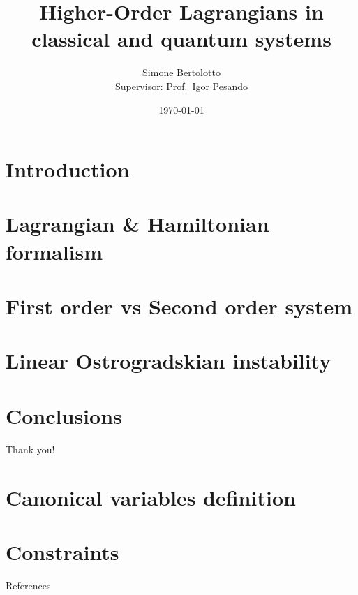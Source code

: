 \documentclass[10pt]{beamer}
\title{Higher-Order Lagrangians in classical and quantum systems}
\date{\today}
\author{Simone Bertolotto\\{\small Supervisor: Prof.\ Igor Pesando}}
\institute{Università degli studi di Torino --- Fisica}
\begin{document}
  \maketitle

  \section{Introduction}
  

  \section{Lagrangian \& Hamiltonian formalism}
  

  \section{First order vs Second order system}
  

  \section{Linear Ostrogradskian instability}
  

  \section{Conclusions}
  

  \begin{frame}[standout]
    Thank you!
  \end{frame}

  \appendix

  \section{Canonical variables definition}
  

  \section{Constraints}
  

  \begin{frame}[allowframebreaks]{References}
    
    
  \end{frame}
\end{document}
